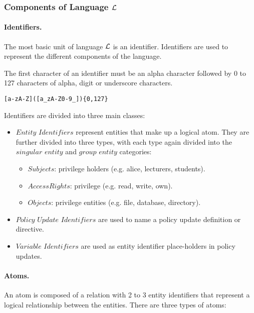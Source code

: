 \documentclass[10pt, twocolumn]{article}
\begin{document}
      \subsubsection{Components of Language $\cal{L}$}

        \paragraph{Identifiers.}
          The most basic unit of language $\cal{L}$ is an identifier.
          Identifiers are used to represent the different components of the
          language. 
    
          The first character of an identifier must be an alpha character
          followed by 0 to 127 characters of alpha, digit or underscore
          characters.

          \begin{verbatim}[a-zA-Z]([a_zA-Z0-9_]){0,127}\end{verbatim}

          Identifiers are divided into three main classes:

          \begin{itemize}
            \item
              $Entity$ $Identifiers$ represent entities that make up a logical
              atom. They are further divided into three types, with each type
              again divided into the $singular$ $entity$ and $group$ $entity$
              categories:
              \begin{itemize}
                \item
                  $Subjects$: privilege holders (e.g. alice, lecturers,
                  students).
                \item
                  $Access Rights$: privilege (e.g. read, write, own).
                \item
                  $Objects$: privilege entities (e.g. file, database,
                  directory).
              \end{itemize}
            \item
              $Policy$ $Update$ $Identifiers$ are used to name a policy
              update definition or directive.
            \item
              $Variable$ $Identifiers$ are used as entity identifier
              place-holders in policy updates.
          \end{itemize}

        \paragraph{Atoms.}
          An atom is composed of a relation with 2 to 3 entity identifiers
          that represent a logical relationship between the entities. There are
          three types of atoms:
\end{document}

